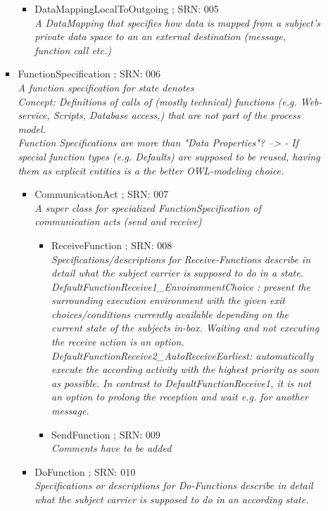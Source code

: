 \begin{itemize}
\begin{itemize}
\begin{itemize}
\begin{itemize}
			\item DataMappingLocalToOutgoing ; SRN: 005 \\ \textit{A DataMapping that specifies how data is mapped from a subject's private data space to an an external destination (message, function call etc.)}
		\end{itemize}
		\item FunctionSpecification ; SRN: 006 \\ \textit{A function specification for state denotes \\ 
			Concept: Definitions of calls of (mostly technical) functions (e.g. Web-service, Scripts, Database access,) that are not part of the process model.\\
			Function Specifications are more than "Data Properties"? --> - If special function types (e.g. Defaults) are supposed to be reused, having them as explicit entities is a the better OWL-modeling choice.}
		\begin{itemize}
			\item CommunicationAct ; SRN: 007 \\ \textit{A super class for specialized FunctionSpecification of communication acts (send and receive)}
			\begin{itemize}
				\item ReceiveFunction ; SRN: 008 \\ \textit{Specifications/descriptions for Receive-Functions describe in detail what the subject carrier is supposed to do in a state.\\
				DefaultFunctionReceive1\_EnvoironmentChoice : present the surrounding execution environment with the given exit choices/conditions currently available depending on the current state of the subjects in-box. Waiting and not executing the receive action is an option.\\
				DefaultFunctionReceive2\_AutoReceiveEarliest: automatically execute the according activity with the highest priority as soon as possible. In contrast to DefaultFunctionReceive1, it is not an option to prolong the reception and wait e.g. for another message.}
				\item SendFunction ; SRN: 009 \\ \textit{Comments have to be added}
			\end{itemize}
			\item DoFunction ; SRN: 010 \\ \textit{Specifications or descriptions for Do-Functions describe in detail what the subject carrier is supposed to do in an according state.
}
\end{itemize}
\end{itemize}
\end{itemize}
\end{itemize}
